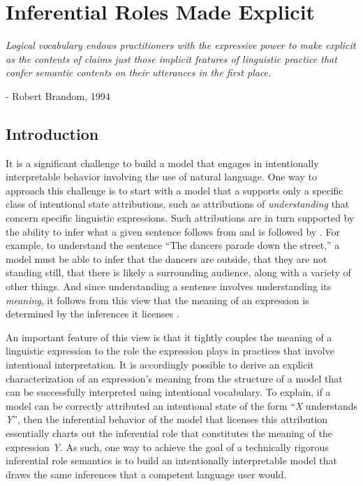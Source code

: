 

\chapter{Inferential Roles Made Explicit}
\renewcommand{\epigraphrule}{0pt}
\setlength{\epigraphwidth}{4.5in}
\epigraph{\textit{Logical vocabulary endows practitioners with the expressive power to make explicit as the contents of claims just those implicit features of linguistic practice that confer semantic contents on their utterances in the first place.}}{- Robert Brandom, 1994}

\section{Introduction}

It is a significant challenge to build a model that engages in intentionally interpretable behavior involving the use of natural language. One way to approach this challenge is to start with a model that a supports only a specific class of intentional state attributions, such as attributions of \textit{understanding} that concern specific linguistic expressions. Such attributions are in turn supported by the ability to infer what a given sentence follows from and is followed by \citep{Brandom:1994}. For example, to understand the sentence ``The dancers parade down the street,'' a model must be able to infer that the dancers are outside, that they are not standing still, that there is likely a surrounding audience, along with a variety of other things. And since understanding a sentence involves understanding its \textit{meaning}, it follows from this view that the meaning of an expression is determined by the inferences it licenses \citep{Brandom:1994,Sellars:1953,Sellars:1954,Brandom:2000,Brandom:2009}. 

An important feature of this view is that it tightly couples the meaning of a linguistic expression to the role the expression plays in practices that involve intentional interpretation. It is accordingly possible to derive an explicit characterization of an expression's meaning from the structure of a model that can be successfully interpreted using intentional vocabulary. To explain, if a model can be correctly attributed an intentional state of the form ``\textit{X} understands \textit{Y}'', then the inferential behavior of the model that licenses this attribution essentially charts out the inferential role that constitutes the meaning of the expression \textit{Y}. As such, one way to achieve the goal of a technically rigorous inferential role semantics is to build an intentionally interpretable model that draws the same inferences that a competent language user would.


